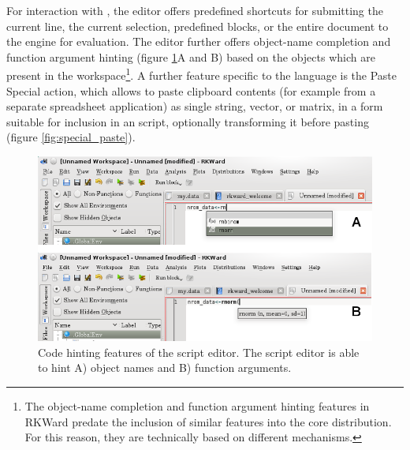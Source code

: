 For interaction with , the editor offers
predefined shortcuts for submitting the current line, the current
selection, predefined blocks, or the entire document to the
 engine for evaluation. The editor further
offers object-name completion and function argument hinting (figure
\ref{fig:code_hinting}A and B) based on the objects which are present in
the  workspace\footnote{The object-name
completion and function argument hinting features in RKWard predate the
inclusion of similar features into the core
 distribution. For this reason, they are
technically based on different mechanisms.}. A further feature specific
to the  language is the
Paste Special action, which allows to
paste clipboard contents (for example from a separate spreadsheet
application) as single string, vector, or matrix, in a form suitable
for inclusion in an  script, optionally
transforming it before pasting (figure \ref{fig:special_paste}).

\begin{figure}[htp]
 \centering
 \includegraphics{../figures/code_hinting.png}
 \caption{Code hinting features of the script editor. The script editor is able to hint A)  object names
and B) function arguments.}
 \label{fig:code_hinting}
\end{figure}

